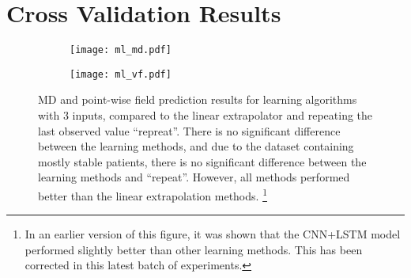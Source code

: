 \section{Cross Validation Results}


\begin{figure}[p]
\begin{minipage}{\textwidth}
	\centering
	\begin{subfigure}[b]{\textwidth}
		\centering
		\texttt{[image: ml\_md.pdf]}
		\caption{}
	\end{subfigure}
	\hfill
	\begin{subfigure}[b]{\textwidth}
		\centering
		\texttt{[image: ml\_vf.pdf]}
		\caption{}
	\end{subfigure}
	\caption[\acs{MD} and point-wise field prediction results for learning algorithms]{\acs{MD} and point-wise field prediction results for learning algorithms with 3 inputs, compared to the linear extrapolator and repeating the last observed value ``repreat''. There is no significant difference between the learning methods, and due to the dataset containing mostly stable patients, there is no significant difference between the learning methods and ``repeat''. However, all methods performed better than the linear extrapolation methods. \footnote{In an earlier version of this figure, it was shown that the CNN+LSTM model performed slightly better than other learning methods. This has been corrected in this latest batch of experiments.}}
	\label{fig:ml_fig}
\end{minipage}
\end{figure}

